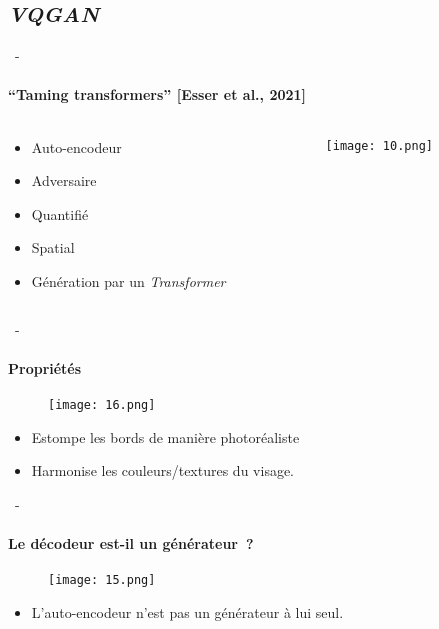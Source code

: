 \documentclass[aspectratio=169, 22pt]{beamer}
\begin{document}
\subsection{\emph{VQGAN}}
\begin{frame}{\secname~- \subsecname}
  \framesubtitle{``Taming transformers'' [Esser et al., 2021]}
  \begin{columns}
    \begin{column}{0.2\linewidth}
      \begin{itemize}
      \item \small Auto-encodeur
      \item \small Adversaire
      \item \small Quantifié
      \item \small Spatial
        \vspace{1em}
      \item \small Génération par un \emph{Transformer}
      \end{itemize}
    \end{column}
    \begin{column}{0.8\linewidth}
      \begin{figure}
        \texttt{[image: 10.png]}
      \end{figure}
    \end{column}
  \end{columns}
\end{frame}

\begin{frame}{\secname~- \subsecname}
  \framesubtitle{Propriétés}
  \begin{figure}
    \texttt{[image: 16.png]}
  \end{figure}
  \begin{itemize}
  \item \alert{Estompe les bords} de manière photoréaliste
  \item \alert{Harmonise} les couleurs/textures du visage.
\end{itemize}
\end{frame}

\begin{frame}{\secname~- \subsecname}
  \framesubtitle{Le décodeur est-il un générateur ?}
  \begin{figure}
    \texttt{[image: 15.png]}
  \end{figure}
  \begin{itemize}
  \item L'auto-encodeur \alert{n'est pas} un générateur à lui seul.        
  \end{itemize}
\end{frame}
\end{document}
